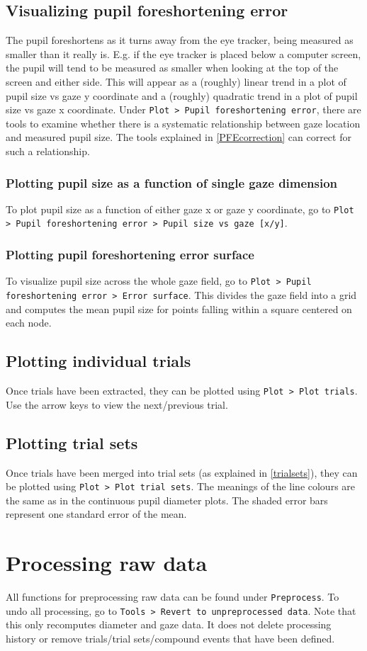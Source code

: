 \documentclass{article}
\begin{document}
\subsection{Visualizing pupil foreshortening error} \label{PFEplot}
The pupil foreshortens as it turns away from the eye tracker, being measured as smaller than it really is. E.g. if the eye tracker is placed below a computer screen, the pupil will tend to be measured as smaller when looking at the top of the screen and either side. This will appear as a (roughly) linear trend in a plot of pupil size vs gaze y coordinate and a (roughly) quadratic trend in a plot of pupil size vs gaze x coordinate. Under \texttt{Plot > Pupil foreshortening error}, there are tools to examine whether there is a systematic relationship between gaze location and measured pupil size. The tools explained in \ref{PFEcorrection} can correct for such a relationship.
\subsubsection{Plotting pupil size as a function of single gaze dimension}
To plot pupil size as a function of either gaze x or gaze y coordinate, go to \texttt{Plot > Pupil foreshortening error > Pupil size vs gaze [x/y]}.
\subsubsection{Plotting pupil foreshortening error surface}
To visualize pupil size across the whole gaze field, go to \texttt{Plot > Pupil foreshortening error > Error surface}. This divides the gaze field into a grid and computes the mean pupil size for points falling within a square centered on each node.
\subsection{Plotting individual trials}
Once trials have been extracted, they can be plotted using \texttt{Plot > Plot trials}. Use the arrow keys to view the next/previous trial.
\subsection{Plotting trial sets}
Once trials have been merged into trial sets (as explained in \ref{trialsets}), they can be plotted using \texttt{Plot > Plot trial sets}. The meanings of the line colours are the same as in the continuous pupil diameter plots. The shaded error bars represent one standard error of the mean.
\section{Processing raw data}
All functions for preprocessing raw data can be found under \texttt{Preprocess}. To undo all processing, go to \texttt{Tools > Revert to unpreprocessed data}. Note that this only recomputes diameter and gaze data. It does not delete processing history or remove trials/trial sets/compound events that have been defined.
\end{document}
